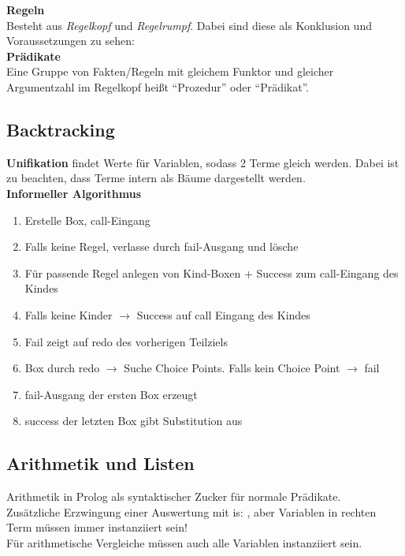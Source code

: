\textbf{Regeln}\\
Besteht aus \textit{Regelkopf} und \textit{Regelrumpf}. Dabei sind diese als Konklusion und Voraussetzungen zu sehen:
\\

\textbf{Prädikate}\\
Eine Gruppe von Fakten/Regeln mit gleichem Funktor und gleicher Argumentzahl im Regelkopf heißt \enquote{Prozedur}
oder \enquote{Prädikat}.

\newpage
\subsection{Backtracking}%
\label{lp:sub:backtracking}
\textbf{Unifikation} findet Werte für Variablen, sodass 2 Terme gleich werden. Dabei ist zu beachten, dass Terme intern
als Bäume dargestellt werden.\\

\textbf{Informeller Algorithmus}
\begin{enumerate}
  \item Erstelle Box, call-Eingang
  \item Falls keine Regel, verlasse durch fail-Ausgang und lösche
  \item Für passende Regel anlegen von Kind-Boxen + Success zum call-Eingang des Kindes
  \item Falls keine Kinder \(\rightarrow\) Success auf call Eingang des Kindes
  \item Fail zeigt auf redo des vorherigen Teilziels
  \item Box durch redo \(\rightarrow\) Suche Choice Points. Falls kein Choice Point \(\rightarrow\) fail
  \item fail-Ausgang der ersten Box erzeugt 
  \item success der letzten Box gibt Substitution aus
\end{enumerate}

\subsection{Arithmetik und Listen}%
\label{lp:sub:arithmetik-listen}
Arithmetik in Prolog als syntaktischer Zucker für normale Prädikate.\\
Zusätzliche Erzwingung einer Auswertung mit is: , aber Variablen
in rechten Term müssen immer instanziiert sein!\\
Für arithmetische Vergleiche müssen auch alle Variablen instanziiert sein.

